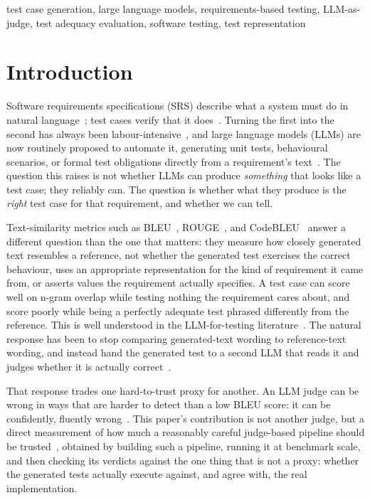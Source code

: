 \documentclass[conference]{IEEEtran}
\begin{document}
\begin{IEEEkeywords}
test case generation, large language models, requirements-based testing,
LLM-as-judge, test adequacy evaluation, software testing, test representation
\end{IEEEkeywords}

\section{Introduction}

Software requirements specifications (SRS) describe what a system must do in
natural language~\cite{iso29148}; test cases verify that it does~\cite{iso29119_1}. Turning the first into the
second has always been labour-intensive~\cite{garousi2020nlp,wang2022umtg}, and large language models (LLMs) are
now routinely proposed to automate it, generating unit tests, behavioural
scenarios, or formal test obligations directly from a requirement's text~\cite{wang2024testingsurvey,hou2024llm4se,fan2023llmse}. The
question this raises is not whether LLMs can produce \emph{something} that
looks like a test case; they reliably can. The question is whether what they
produce is the \emph{right} test case for that requirement, and whether we can
tell.

Text-similarity metrics such as BLEU~\cite{papineni2002bleu}, ROUGE~\cite{lin2004rouge}, and CodeBLEU~\cite{ren2020codebleu} answer a different
question than the one that matters: they measure how closely generated text
resembles a reference, not whether the generated test exercises the correct
behaviour, uses an appropriate representation for the kind of requirement it
came from, or asserts values the requirement actually specifies. A test case
can score well on n-gram overlap while testing nothing the requirement cares
about, and score poorly while being a perfectly adequate test phrased
differently from the reference. This is well understood in the LLM-for-testing
literature~\cite{evtikhiev2023bleu,schafer2023empirical,yuan2023chatgpt,siddiq2023empirical,liu2023evalplus,chen2021codex}. The natural response has been to stop
comparing generated-text wording to reference-text wording, and instead hand
the generated test to a second LLM that reads it and judges whether it is
actually correct~\cite{zheng2023judging,liu2023geval,gu2024judgesurvey}.

That response trades one hard-to-trust proxy for another. An LLM judge can be
wrong in ways that are harder to detect than a low BLEU score: it can be
confidently, fluently wrong~\cite{wang2024notfair,panickssery2024selfpref}. This paper's contribution is not another judge,
but a direct measurement of how much a reasonably careful judge-based pipeline
should be trusted~\cite{ralph2018construct,kaner2004metrics}, obtained by building such a pipeline, running it at
benchmark scale, and then checking its verdicts against the one thing that is
not a proxy: whether the generated tests actually execute against, and
agree with, the real implementation.
\end{document}
